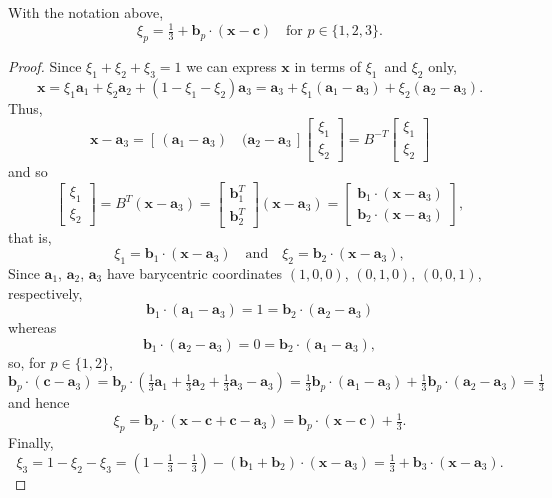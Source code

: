 \begin{theorem}\label{thm: barycentric}
With the notation above,
\[
\xi_p=\tfrac13+\boldsymbol{b}_p\cdot(\boldsymbol{x}-\boldsymbol{c})
\quad\text{for $p\in\{1,2,3\}$.}
\]
\end{theorem}
\begin{proof}
Since $\xi_1+\xi_2+\xi_3=1$ we can express $\boldsymbol{x}$ in terms of 
$\xi_1$~and $\xi_2$ only,
\[
\boldsymbol{x}=\xi_1\boldsymbol{a}_1+\xi_2\boldsymbol{a}_2
    +(1-\xi_1-\xi_2)\boldsymbol{a}_3
    =\boldsymbol{a}_3+\xi_1(\boldsymbol{a}_1-\boldsymbol{a}_3)
    +\xi_2(\boldsymbol{a}_2-\boldsymbol{a}_3).
\]
Thus,
\[
\boldsymbol{x}-\boldsymbol{a}_3
=[\,(\boldsymbol{a}_1-\boldsymbol{a}_3)\quad
    (\boldsymbol{a}_2-\boldsymbol{a}_3\,]
\begin{bmatrix}\xi_1\\ \xi_2 \end{bmatrix}
=B^{-T}\begin{bmatrix}\xi_1\\ \xi_2 \end{bmatrix}
\]
and so
\[
\begin{bmatrix}\xi_1\\ \xi_2 \end{bmatrix}=B^T(\boldsymbol{x}-\boldsymbol{a}_3)
=\begin{bmatrix}\boldsymbol{b}_1^T\\ \boldsymbol{b}_2^T\end{bmatrix}
    (\boldsymbol{x}-\boldsymbol{a}_3)
=\begin{bmatrix}\boldsymbol{b}_1\cdot(\boldsymbol{x}-\boldsymbol{a}_3)\\
\boldsymbol{b}_2\cdot(\boldsymbol{x}-\boldsymbol{a}_3)\end{bmatrix},
\]
that is,
\[
\xi_1=\boldsymbol{b}_1\cdot(\boldsymbol{x}-\boldsymbol{a}_3)
\quad\text{and}\quad
\xi_2=\boldsymbol{b}_2\cdot(\boldsymbol{x}-\boldsymbol{a}_3),
\]
Since $\boldsymbol{a}_1$, $\boldsymbol{a}_2$, $\boldsymbol{a}_3$ have
barycentric coordinates $(1,0,0)$, $(0,1,0)$, $(0,0,1)$, respectively,
\[
\boldsymbol{b}_1\cdot(\boldsymbol{a}_1-\boldsymbol{a}_3)
=1=\boldsymbol{b}_2\cdot(\boldsymbol{a}_2-\boldsymbol{a}_3)
\]
whereas
\[
\boldsymbol{b}_1\cdot(\boldsymbol{a}_2-\boldsymbol{a}_3)
=0=\boldsymbol{b}_2\cdot(\boldsymbol{a}_1-\boldsymbol{a}_3),
\]
so, for $p\in\{1,2\}$,
\[
\boldsymbol{b}_p\cdot(\boldsymbol{c}-\boldsymbol{a}_3)
    =\boldsymbol{b}_p\cdot(
\tfrac13\boldsymbol{a}_1+\tfrac13\boldsymbol{a}_2+\tfrac13\boldsymbol{a}_3
    -\boldsymbol{a}_3)
    =\tfrac13\boldsymbol{b}_p\cdot(\boldsymbol{a}_1-\boldsymbol{a}_3)
    +\tfrac13\boldsymbol{b}_p\cdot(\boldsymbol{a}_2-\boldsymbol{a}_3)
    =\tfrac13
\]
and hence
\[
\xi_p=\boldsymbol{b}_p\cdot(
    \boldsymbol{x}-\boldsymbol{c}+\boldsymbol{c}-\boldsymbol{a}_3)
    =\boldsymbol{b}_p\cdot(\boldsymbol{x}-\boldsymbol{c})+\tfrac13.
\]
Finally,
\[
\xi_3=1-\xi_2-\xi_3=(1-\tfrac13-\tfrac13)
    -(\boldsymbol{b}_1+\boldsymbol{b}_2)\cdot
    (\boldsymbol{x}-\boldsymbol{a}_3)
    =\tfrac13+\boldsymbol{b}_3\cdot(\boldsymbol{x}-\boldsymbol{a}_3).
\]
\end{proof}

